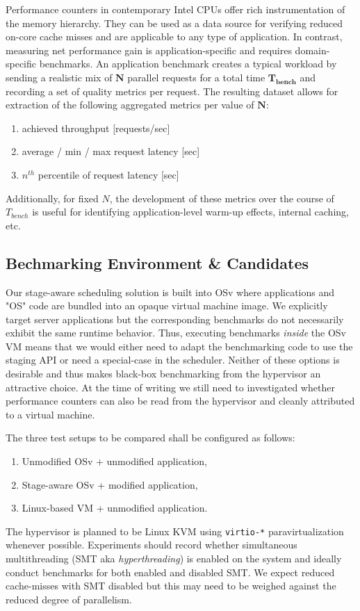 \documentclass{article}
\begin{document}
Performance counters in contemporary Intel CPUs offer rich instrumentation of the memory hierarchy. They can be used as a
data source for verifying reduced on-core cache misses and are applicable to any type of application.
In contrast, measuring net performance gain is application-specific and requires domain-specific benchmarks.
An application benchmark creates a typical workload by sending a realistic mix of $\mathbf{N}$ parallel requests for a
total time $\mathbf{T_{bench}}$ and recording a set of quality metrics per request.
The resulting dataset allows for extraction of the following aggregated metrics per value of $\mathbf{N}$:
\begin{enumerate}[label=\emph{(\alph*)}]
    \item achieved throughput [requests/sec]
    \item average / min / max request latency [sec]
    \item $n^{th}$ percentile of request latency [sec]
\end{enumerate}
Additionally, for fixed $N$, the development of these metrics over the course of $T_{bench}$ is useful for identifying
application-level warm-up effects, internal caching, etc.

\subsection{Bechmarking Environment \& Candidates}\label{environment}

Our stage-aware scheduling solution is built into OSv where applications and "OS" code are bundled into an opaque virtual
machine image.
We explicitly target server applications but the corresponding benchmarks do not necessarily exhibit the same runtime
behavior.
Thus, executing benchmarks \emph{inside} the OSv VM means that we would either need to adapt the benchmarking code to
use the staging API or need a special-case in the scheduler.
Neither of these options is desirable and thus makes black-box benchmarking from the hypervisor an attractive choice.
At the time of writing we still need to investigated whether performance counters can also be read from the hypervisor
and cleanly attributed to a virtual machine.

The three test setups to be compared shall be configured as follows:
\begin{enumerate}
    \item Unmodified OSv + unmodified application,
    \item Stage-aware OSv + modified application,
    \item \label{linuxvmsetup} Linux-based VM + unmodified application.
\end{enumerate}
The hypervisor is planned to be Linux KVM using \texttt{virtio-*} paravirtualization whenever possible.
Experiments should record whether simultaneous multithreading (SMT aka \textit{hyperthreading}) is enabled on the system
and ideally conduct benchmarks for both enabled and disabled SMT.
We expect reduced cache-misses with SMT disabled but this may need to be weighed against the reduced degree of parallelism.
\end{document}

